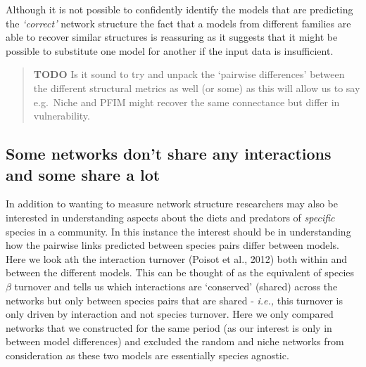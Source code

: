 \documentclass[
]{article}
\begin{document}
Although it is not possible to confidently identify the models that are
predicting the \emph{`correct'} network structure the fact that a models
from different families are able to recover similar structures is
reassuring as it suggests that it might be possible to substitute one
model for another if the input data is insufficient.

\begin{quote}
\textbf{TODO} Is it sound to try and unpack the `pairwise differences'
between the different structural metrics as well (or some) as this will
allow us to say e.g.~Niche and PFIM might recover the same connectance
but differ in vulnerability.
\end{quote}

\subsection{Some networks don't share any interactions and some share a
lot}\label{some-networks-dont-share-any-interactions-and-some-share-a-lot}

In addition to wanting to measure network structure researchers may also
be interested in understanding aspects about the diets and predators of
\emph{specific} species in a community. In this instance the interest
should be in understanding how the pairwise links predicted between
species pairs differ between models. Here we look ath the interaction
turnover (Poisot et al., 2012) both within and between the different
models. This can be thought of as the equivalent of species \(\beta\)
turnover and tells us which interactions are `conserved' (shared) across
the networks but only between species pairs that are shared -
\emph{i.e.,} this turnover is only driven by interaction and not species
turnover. Here we only compared networks that we constructed for the
same period (as our interest is only in between model differences) and
excluded the random and niche networks from consideration as these two
models are essentially species agnostic.
\end{document}
